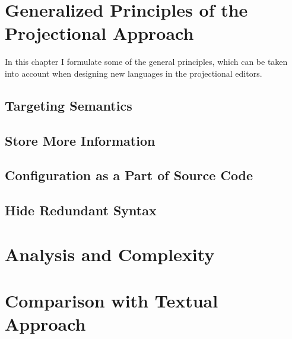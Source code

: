 \chapter{Generalized Principles of the Projectional Approach}

In this chapter I formulate some of the general principles, which can be taken into
account when designing new languages in the projectional editors.

\section{Targeting Semantics}

\section{Store More Information}


\section{Configuration as a Part of Source Code}

\section{Hide Redundant Syntax}



\chapter{Analysis and Complexity}



\chapter{Comparison with Textual Approach}

